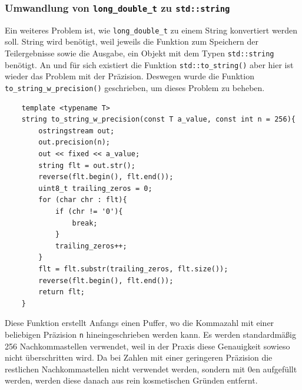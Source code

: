 \documentclass[12pt]{article}
\begin{document}
\subsubsection{Umwandlung von \texttt{long\_double\_t} zu \texttt{std::string}}
Ein weiteres Problem ist, wie \texttt{long\_double\_t} zu einem String
konvertiert werden soll. String wird benötigt, weil jeweils die Funktion zum
Speichern der Teilergebnisse sowie die Ausgabe, ein Objekt mit dem Typen 
\texttt{std::string} benötigt. 
\newline
An und für sich existiert die Funktion 
\texttt{std::to\_string()} aber hier ist wieder das Problem mit der Präzision.
Deswegen wurde die Funktion \newline\texttt{to\_string\_w\_precision()}
geschrieben, um dieses Problem zu beheben.
\begin{verbatim} 
    template <typename T>
    string to_string_w_precision(const T a_value, const int n = 256){
        ostringstream out;
        out.precision(n);
        out << fixed << a_value;
        string flt = out.str();
        reverse(flt.begin(), flt.end());
        uint8_t trailing_zeros = 0;
        for (char chr : flt){
            if (chr != '0'){
                break;
            }
            trailing_zeros++;
        }
        flt = flt.substr(trailing_zeros, flt.size());
        reverse(flt.begin(), flt.end());
        return flt;
    }
\end{verbatim}
Diese Funktion erstellt Anfangs einen Puffer, wo die Kommazahl mit einer
beliebigen Präzision \texttt{n} hineingeschrieben werden kann.
Es werden standardmäßig 256 Nachkommastellen verwendet, weil in der Praxis 
diese Genauigkeit sowieso nicht überschritten wird. Da bei Zahlen mit einer
geringeren Präzision die restlichen Nachkommastellen nicht verwendet werden,
sondern mit 0en aufgefüllt werden, werden diese danach aus rein kosmetischen 
Gründen entfernt.
\end{document}
